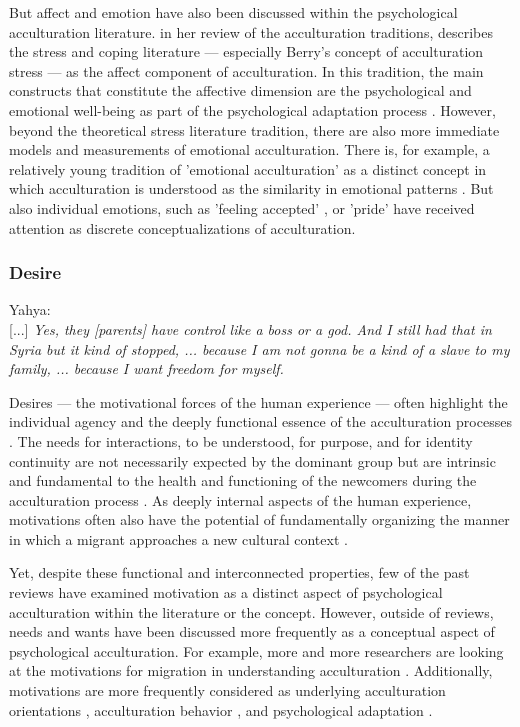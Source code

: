 \documentclass[man, 12pt, a4paper, mask]{apa7}
\begin{document}
But affect and emotion have also been discussed within the psychological acculturation literature. \citet{Ward2001} in her review of the acculturation traditions, describes the stress and coping literature --- especially Berry's concept of acculturation stress \citep{Berry1997b} --- as the affect component of acculturation. In this tradition, the main constructs that constitute the affective dimension are the psychological and emotional well-being as part of the psychological adaptation process \citep[including, for example, life satisfaction and depression;][]{Ward2019}. However, beyond the theoretical stress literature tradition, there are also more immediate models and measurements of emotional acculturation. There is, for example, a relatively young tradition of 'emotional acculturation' as a distinct concept in which acculturation is understood as the similarity in emotional patterns \citep[see][for a review]{DeLeersnyder2017}. But also individual emotions, such as 'feeling accepted' \citep{Jasini2018}, or 'pride' \citep{Suinn1995} have received attention as discrete conceptualizations of acculturation. 

\subsubsection{Desire}
\begin{displayquote}
    Yahya:\\
    {[...]} \textit{Yes, they [parents] have control like a boss or a god. And I still had that in Syria but it kind of stopped, ... because I am not gonna be a kind of a slave to my family, ... because I want freedom for myself.}
\end{displayquote}

Desires --- the motivational forces of the human experience --- often highlight the individual agency and the deeply functional essence of the acculturation processes \citep[][]{gezentsvey2008}. The needs for interactions, to be understood, for purpose, and for identity continuity are not necessarily expected by the dominant group but are intrinsic and fundamental to the health and functioning of the newcomers during the acculturation process \citep[e.g.,][]{Anzaldua1987}. As deeply internal aspects of the human experience, motivations often also have the potential of fundamentally organizing the manner in which a migrant approaches a new cultural context \citep[][]{vishkin2021, kashima2014}. 

Yet, despite these functional and interconnected properties, few of the past reviews have examined motivation as a distinct aspect of psychological acculturation within the literature or the concept. However, outside of reviews, needs and wants have been discussed more frequently as a conceptual aspect of psychological acculturation. For example, more and more researchers are looking at the motivations for migration in understanding acculturation \citep{Sandu2018, Echterhoff2020}. Additionally, motivations are more frequently considered as underlying  acculturation orientations \citep{Recker2017a}, acculturation behavior \citep{Reece2000}, and psychological adaptation \citep{Safdar2003}. 
\end{document}
